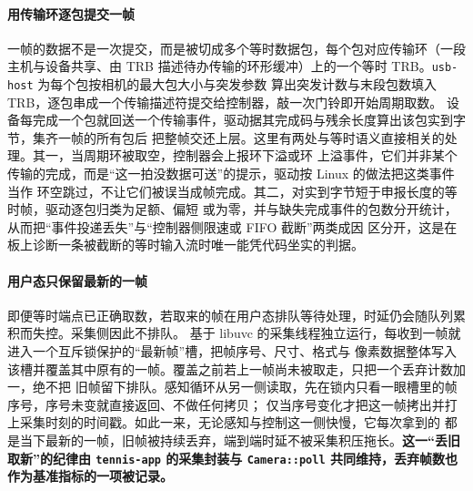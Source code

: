\paragraph{用传输环逐包提交一帧}
一帧的数据不是一次提交，而是被切成多个等时数据包，每个包对应传输环（一段主机与设备共享、由 TRB
描述待办传输的环形缓冲）上的一个等时 TRB。\texttt{usb-host} 为每个包按相机的最大包大小与突发参数
算出突发计数与末段包数填入 TRB，逐包串成一个传输描述符提交给控制器，敲一次门铃即开始周期取数。
设备每完成一个包就回送一个传输事件，驱动据其完成码与残余长度算出该包实到字节，集齐一帧的所有包后
把整帧交还上层。这里有两处与等时语义直接相关的处理。其一，当周期环被取空，控制器会上报环下溢或环
上溢事件，它们并非某个传输的完成，而是“这一拍没数据可送”的提示，驱动按 Linux 的做法把这类事件当作
环空跳过，不让它们被误当成帧完成。其二，对实到字节短于申报长度的等时帧，驱动逐包归类为足额、偏短
或为零，并与缺失完成事件的包数分开统计，从而把“事件投递丢失”与“控制器侧限速或 FIFO 截断”两类成因
区分开，这是在板上诊断一条被截断的等时输入流时唯一能凭代码坐实的判据。

\paragraph{用户态只保留最新的一帧}
即便等时端点已正确取数，若取来的帧在用户态排队等待处理，时延仍会随队列累积而失控。采集侧因此不排队。
基于 libuvc 的采集线程独立运行，每收到一帧就进入一个互斥锁保护的“最新帧”槽，把帧序号、尺寸、格式与
像素数据整体写入该槽并覆盖其中原有的一帧。覆盖之前若上一帧尚未被取走，只把一个丢弃计数加一，绝不把
旧帧留下排队。感知循环从另一侧读取，先在锁内只看一眼槽里的帧序号，序号未变就直接返回、不做任何拷贝；
仅当序号变化才把这一帧拷出并打上采集时刻的时间戳。如此一来，无论感知与控制这一侧快慢，它每次拿到的
都是当下最新的一帧，旧帧被持续丢弃，端到端时延不被采集积压拖长。\textbf{这一“丢旧取新”的纪律由
\texttt{tennis-app} 的采集封装与 \texttt{Camera::poll} 共同维持，丢弃帧数也作为基准指标的一项被记录。}
